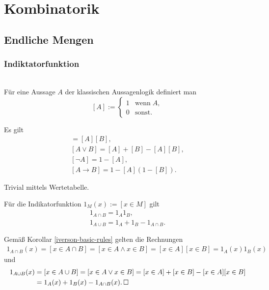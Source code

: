 
\chapter{Kombinatorik}

\section{Endliche Mengen}

\subsection{Indiktatorfunktion}

\begin{Definition}\mbox{}\\
Für eine Aussage $A$ der klassischen Aussagenlogik definiert man
\[[A] := \begin{cases}
1 &\text{wenn}\;A,\\
0 &\text{sonst}.
\end{cases}\]
\end{Definition}

\begin{Korollar}\label{iverson-basic-rules}
Es gilt
\begin{gather*}
[A\land B] = [A][B],\\
[A\lor B] = [A]+[B]-[A][B],\\
[\neg A] = 1-[A],\\
[A\to B] = 1-[A](1-[B]).
\end{gather*}
\end{Korollar}
\begin{Beweis} Trivial mittels Wertetabelle.\,\qedsymbol
\end{Beweis}

\begin{Korollar}\label{indicator-set-op}
Für die Indikatorfunktion $1_M(x):=[x\in M]$ gilt
\begin{gather*}
1_{A\cap B} = 1_A 1_B,\\
1_{A\cup B} = 1_A + 1_B - 1_{A\cap B}.
\end{gather*}
\end{Korollar}
\begin{Beweis}
Gemäß Korollar \ref{iverson-basic-rules} gelten die
Rechnungen
\begin{align*}
1_{A\cap B}(x) = [x\in A\cap B]
= [x\in A\land x\in B] = [x\in A][x\in B] = 1_A(x)1_B(x)
\end{align*}
und
\begin{align*}
1_{A\cup B}(x) &= [x\in A\cup B] = [x\in A\lor x\in B]
= [x\in A] + [x\in B] - [x\in A][x\in B]\\
&= 1_A(x) + 1_B(x) - 1_{A\cap B}(x).\,\square
\end{align*}
\end{Beweis}


